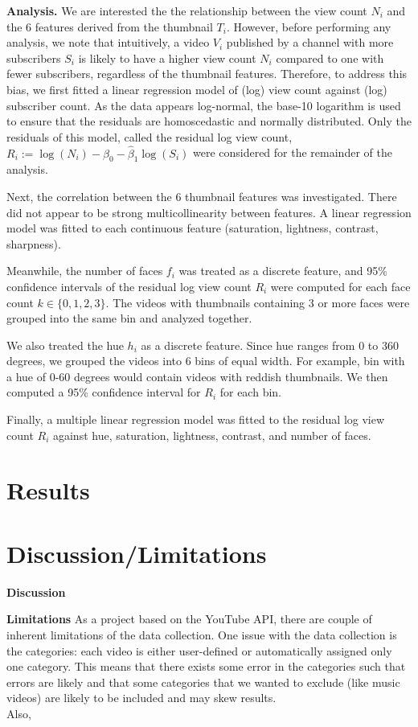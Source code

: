 \documentclass{article}
\begin{document}
\textbf{Analysis.} We are interested the the relationship between the view count $N_i$ and the 6 features derived from the thumbnail $T_i$. However, before performing any analysis, we note that intuitively, a video $V_i$ published by a channel with more subscribers $S_i$ is likely to have a higher view count $N_i$ compared to one with fewer subscribers, regardless of the thumbnail features. Therefore, to address this bias, we first fitted a linear regression model of (log) view count against (log) subscriber count. As the data appears log-normal, the base-10 logarithm is used to ensure that the residuals are homoscedastic and normally distributed. Only the residuals of this model, called the residual log view count, $R_{i} := \log(N_i) - \hat{\beta}_0 - \hat{\beta}_1 \log(S_i)$ were considered for the remainder of the analysis.


Next, the correlation between the 6 thumbnail features was investigated. There did not appear to be strong multicollinearity between features. A linear regression model was fitted to each continuous feature (saturation, lightness, contrast, sharpness).

Meanwhile, the number of faces $f_{i}$ was treated as a discrete feature, and 95\% confidence intervals of the residual log view count $R_{i}$ were computed for each face count $k\in\{0,1,2,3\}$. The videos with thumbnails containing 3 or more faces were grouped into the same bin and analyzed together.

We also treated the hue $h_{i}$ as a discrete feature. Since hue ranges from 0 to 360 degrees, we grouped the videos into 6 bins of equal width. For example, bin with a hue of 0-60 degrees would contain videos with reddish thumbnails. We then computed a 95\% confidence interval for $R_{i}$ for each bin.

Finally, a multiple linear regression model was fitted to the residual log view count $R_{i}$ against hue, saturation, lightness, contrast, and number of faces.

\section{Results}


\section{Discussion/Limitations}
\textbf{Discussion }

\textbf{Limitations } As a project based on the YouTube API, there are couple of inherent limitations of the data collection. One issue with the data collection is the categories: each video is either user-defined or automatically assigned only one category. This means that there exists some error in the categories such that errors are likely and that some categories that we wanted to exclude (like music videos) are likely to be included and may skew results. \\
Also, 
\end{document}
